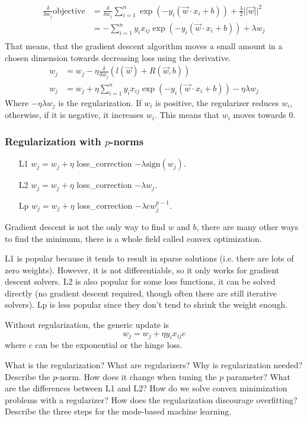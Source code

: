 \begin{align}
    \frac \delta {\delta w_j} \text{objective} &= \frac \delta {\delta w_j} \sum_{i=1}^n \exp(-y_i(\vec{w} \cdot x_i + b))+ \frac \lambda 2 ||\vec{w}||^2\\
    &= -\sum_{i=1}^n y_i x_{ij} \exp(-y_i(\vec{w} \cdot x_i + b)) + \lambda w_j\\
\end{align}
That means, that the gradient descent algorithm moves a small amount in a chosen dimension towards decreasing loss using the derivative.
\begin{align}
    w_j &= w_j - \eta \frac \delta {\delta w_j} (l(\vec{w}) + R(\vec{w},b))\\
    w_j &= w_j + \eta \sum_{i=1}^n y_i x_{ij} \exp(-y_i(\vec{w} \cdot x_i + b)) - \eta \lambda w_j
\end{align}
Where \(-\eta \lambda w_j\) is the regularization. If \(w_i\) is positive, the regularizer reduces \(w_i\), otherwise, if it is negative, it increases \(w_i\). This means that \(w_i\) moves towards 0.

\subsubsection{Regularization with \(p\)-norms}
\begin{itemize}
    \item[L1] \(w_j = w_j + \eta\) loss\_correction \(- \lambda \text{sign}(w_j)\).
    \item[L2] \(w_j = w_j + \eta\) loss\_correction \(- \lambda w_j\).
    \item[Lp] \(w_j = w_j + \eta\) loss\_correction \(- \lambda c w_j^{p-1}\).
\end{itemize}
Gradient descent is not the only way to find \(w\) and \(b\), there are many other ways to find the minimum, there is a whole field called convex optimization.

L1 is popular because it tends to result in sparse solutions (i.e. there are lots of zero weights). However, it is not differentiable, so it only works for gradient descent solvers. L2 is also popular for some loss functions, it can be solved directly (no gradient descent required, though often there are still iterative solvers). Lp is less popular since they don't tend to shrink the weight enough.

Without regularization, the generic update is 
\begin{equation}
    w_j = w_j + \eta y_i x_{ij} c
\end{equation}
where \(c\) can be the exponential or the hinge loss.

\newpage
\begin{exercise}[topsep=20pt, itemsep=10pt]
    \ex What is the regularization? What are regularizers?
    \ex[!] Why is regularization needed?
    \ex Describe the \(p\)-norm. How does it change when tuning the \(p\) parameter?
    \ex[!] What are the differences between L1 and L2?
    \ex How do we solve convex minimization problems with a regularizer?
    \ex[!] How does the regularization discourage overfitting?
    \ex Describe the three steps for the mode-based machine learning.
\end{exercise}
